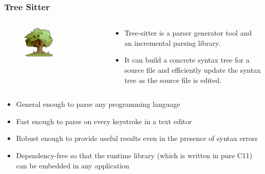 \documentclass[dvipsnames, 10pt]{beamer}
\begin{document}
\begin{frame}
  \frametitle{Tree Sitter}
  \begin{columns}
    \begin{column}{0.5\textwidth}
      \begin{figure}
        \begin{center}
          \includegraphics[width=0.5\textwidth]{figures/solution/tree-sitter-logo.png}
        \end{center}
      \end{figure}
    \end{column}
    \begin{column}{0.5\textwidth}
      \begin{itemize}
        \item Tree-sitter is a parser generator tool and an incremental parsing library.
        \item It can build a concrete syntax tree for a source file and efficiently update the syntax tree as the source file is edited.
      \end{itemize}
    \end{column}
  \end{columns}
  \begin{itemize}
    \item General enough to parse any programming language
    \item Fast enough to parse on every keystroke in a text editor
    \item Robust enough to provide useful results even in the presence of syntax errors
    \item Dependency-free so that the runtime library (which is written in pure C11) can be embedded in any application
  \end{itemize}
\end{frame}
\end{document}
